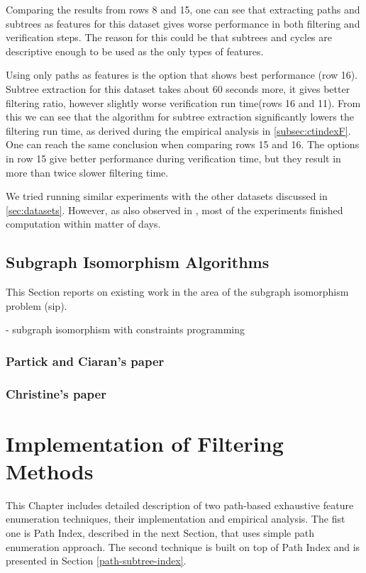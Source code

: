 \documentclass{l4proj}
\begin{document}
Comparing the results from rows 8 and 15, one can see that extracting paths and subtrees as features for this dataset gives worse performance in both filtering and verification steps. The reason for this could be that subtrees and cycles are descriptive enough to be used as the only types of features.

Using only paths as features is the option that shows best performance (row 16). Subtree extraction for this dataset takes about 60 seconds more, it gives better filtering ratio, however slightly worse verification run time(rows 16 and 11). From this we can see that the algorithm for subtree extraction significantly lowers the filtering run time, as derived during the empirical analysis in \ref{subsec:ctindexF}. One can reach the same conclusion when comparing rows 15 and 16. The options in row 15 give better performance during verification time, but they result in more than twice slower filtering time.

We tried running similar experiments with the other datasets discussed in \ref{sec:datasets}. However, as also observed in \cite{foteini}, most of the experiments finished computation within matter of days.


\section{Subgraph Isomorphism Algorithms}
\label{sec:sipalgos}
This Section reports on existing work in the area of the subgraph isomorphism problem (\gls{sip}).

- subgraph isomorphism with constraints programming

\subsection{Partick and Ciaran's paper}
\label{sec:sippatrick}

\subsection{Christine's paper}
\label{sec:sipchristine}

\chapter{Implementation of Filtering Methods}
This Chapter includes detailed description of two path-based exhaustive feature enumeration techniques, their implementation and empirical analysis. The fist one is Path Index, described in the next Section, that uses simple path enumeration approach. The second technique is built on top of Path Index and is presented in Section \ref{path-subtree-index}.
\end{document}

